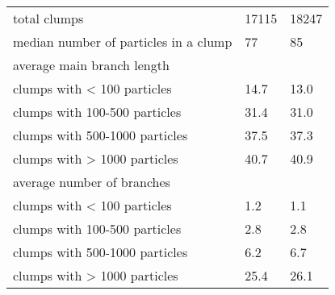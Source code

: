 \begin{table*}
{\begin{tabular}[c]{l | p{2.8cm} | p{2.8cm} |}
			\hline
			total clumps	 													&	 17115	& 	18247 	\\			
			median number of particles in a clump 	&	 77			& 	85 		\\			
			\hline
			average main branch length & & \\
			clumps with < 100 particles			&	14.7	& 	13.0 	\\			
			clumps with 100-500 particles		&	31.4	& 	31.0 	\\			
			clumps with 500-1000 particles	&	37.5	& 	37.3 	\\			
			clumps with > 1000 particles		&	40.7	& 	40.9 	\\			
			\hline
			average number of branches & & \\
			clumps with < 100 particles			&	1.2		& 	1.1 	\\			
			clumps with 100-500 particles		&	2.8		& 	2.8 	\\			
			clumps with 500-1000 particles	&	6.2		& 	6.7 	\\			
			clumps with > 1000 particles		&	25.4	& 	26.1 	\\				
			\hline	
		\end{tabular}
	}
\end{table*}